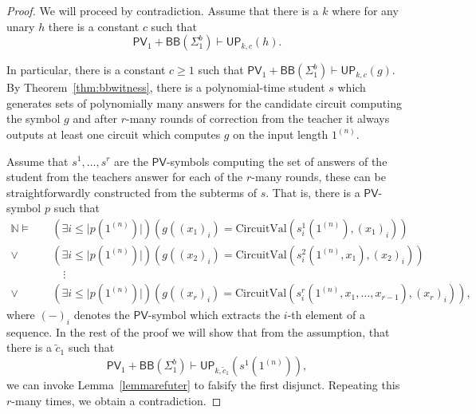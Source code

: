 \documentclass[11pt]{article}
\newcommand{\PV}{\mathsf{PV}}
\newcommand{\UP}{\mathsf{UP}}
\newcommand{\CircuitVal}{\text{CircuitVal}}
\newcommand{\abs}[1]{\lvert #1 \rvert}
\theoremstyle{definition}
\theoremstyle{definition}
\theoremstyle{remark}
\begin{document}
\begin{proof}
    We will proceed by contradiction. Assume that there is a $k$ where for any unary $h$ there is a constant $c$ such that \[\PV_1+\mathsf{BB}(\Sigma^b_1)\vdash \UP_{k,c}(h).\]

    In particular, there is a constant $c\geq1$ such that $\PV_1+\mathsf{BB}(\Sigma^b_1)\vdash \UP_{k,c}(g).$ By Theorem~\ref{thm:bbwitness}, there is a polynomial-time student $s$ which generates sets of polynomially many answers for the candidate circuit computing the symbol $g$ and after $r$-many rounds of correction from the teacher it always outputs at least one circuit which computes $g$ on the input length $1^{(n)}$. 
    
    Assume that $s^1,\dots,s^{r}$ are the $\PV$-symbols computing the set of answers of the student from the teachers answer for each of the $r$-many rounds, these can be straightforwardly constructed from the subterms of $s$. That is, there is a $\PV$-symbol $p$ such that
    \begin{align*}
        \mathbb{N}\models \quad&(\exists i\leq \abs{p(1^{(n)})})(g((x_1)_i)=\CircuitVal(s^1_i(1^{(n)}),(x_1)_i))\\
                          \lor&(\exists i\leq \abs{p(1^{(n)})})(g((x_2)_i)=\CircuitVal(s^2_i(1^{(n)},x_1),(x_2)_i))\\
                          &\quad\vdots\\
                          \lor&(\exists i\leq \abs{p(1^{(n)})})(g((x_r)_i)=\CircuitVal(s^r_i(1^{(n)},x_1,\dots,x_{r-1}),(x_{r})_i)),
    \end{align*}
    where $(-)_i$ denotes the $\PV$-symbol which extracts the $i$-th element of a sequence. In the rest of the proof we will show that from the assumption, that there is a $\tilde c_1$ such that \[\PV_1+\mathsf{BB}(\Sigma^b_1)\vdash \UP_{k,\tilde c_1}(s^1(1^{(n)})),\] we can invoke Lemma~\ref{lemmarefuter} to falsify the first disjunct. Repeating this $r$-many times, we obtain a contradiction.
    

\end{proof}
\end{document}
